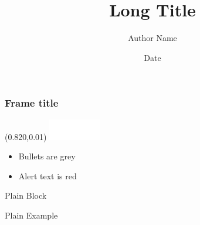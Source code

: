\documentclass{beamer} %
\title[ShortTitle]{Long Title}
\author{Author Name}
\institute[UCalgary]{University of Calgary}
\date{Date}
\newcommand{\TitleLogo}{
 \setlength{\TPHorizModule}{364pt}
 \setlength{\TPVertModule}{273pt}
 \begin{textblock}{1}(0.820,0.01)
 \includegraphics[width=0.9in]{CalgLogoWhite.eps}
 \end{textblock}
}
\begin{document}
\frame[plain]{\titlepage}

\begin{frame}
\frametitle{Frame title}
\TitleLogo

\begin{itemize}
\item Bullets are grey
\item Alert text is \alert{red}
\end{itemize}

\begin{block}{Plain Block}

\end{block}

\begin{example}[]
Plain Example
\end{example}



\end{frame}
\end{document}
